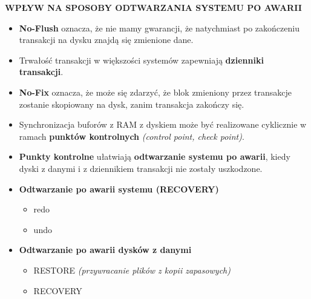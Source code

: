 \documentclass[a5paper,6pt]{article}
\begin{document}
    \textbf{WPŁYW NA SPOSOBY ODTWARZANIA SYSTEMU PO AWARII}
    \begin{itemize}
        \item \textbf{No-Flush} oznacza, że nie mamy gwarancji, że natychmiast
              po zakończeniu transakcji na dysku znajdą się zmienione dane.
        \item Trwałość transakcji w większości systemów zapewniają
              \textbf{dzienniki transakcji}.
        \item \textbf{No-Fix} oznacza, że może się zdarzyć, że blok zmieniony
              przez transakcje zostanie skopiowany na dysk, zanim transakcja
              zakończy się.
        \item Synchronizacja buforów z RAM z dyskiem może być realizowane
              cyklicznie w ramach \textbf{punktów kontrolnych}
              \textit{(control point, check point)}.
        \item \textbf{Punkty kontrolne} ułatwiają \textbf{odtwarzanie systemu
              po awarii}, kiedy dyski z danymi i z dziennikiem transakcji nie
              zostały uszkodzone.

    \pagebreak

        \item \textbf{Odtwarzanie po awarii systemu (RECOVERY)}
        \begin{itemize}
            \item redo
            \item undo
        \end{itemize}

        \item \textbf{Odtwarzanie po awarii dysków z danymi}
        \begin{itemize}
            \item RESTORE \textit{(przywracanie plików z kopii zapasowych)}
            \item RECOVERY
        \end{itemize}
    \end{itemize}
\end{document}
